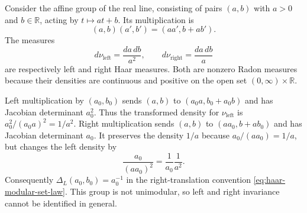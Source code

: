 \begin{example}\label{measure.haar-affine}
Consider the affine group of the real line, consisting of pairs $(a,b)$ with $a>0$ and $b\in\mathbb R$, acting by $t\mapsto at+b$. Its multiplication is
\[
 (a,b)(a',b')=(aa',b+ab').
\]
The measures
\[
 d\nu_{\mathrm{left}}=\frac{da\,db}{a^2},
 \qquad
 d\nu_{\mathrm{right}}=\frac{da\,db}{a}
\]
are respectively left and right Haar measures. Both are nonzero Radon measures because their densities are continuous and positive on the open set $(0,\infty)\times\mathbb R$.

Left multiplication by $(a_0,b_0)$ sends $(a,b)$ to $(a_0a,b_0+a_0b)$ and has Jacobian determinant $a_0^2$. Thus the transformed density for $\nu_{\mathrm{left}}$ is $a_0^2/(a_0a)^2=1/a^2$. Right multiplication sends $(a,b)$ to $(aa_0,b+ab_0)$ and has Jacobian determinant $a_0$. It preserves the density $1/a$ because $a_0/(aa_0)=1/a$, but changes the left density by
\[
 \frac{a_0}{(aa_0)^2}=\frac1{a_0}\frac1{a^2}.
\]
Consequently $\Delta_L(a_0,b_0)=a_0^{-1}$ in the right-translation convention \eqref{eq:haar-modular-set-law}. This group is not unimodular, so left and right invariance cannot be identified in general.
\end{example}
